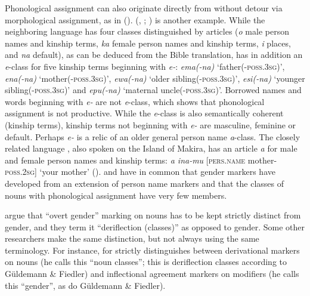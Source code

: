 \documentclass[output=collectionpaper]{langsci/langscibook}
\begin{document}
Phonological assignment can also originate directly from  without detour via morphological assignment, as in  (\citealt{Waelchli2018}).  (, ; \citealt[26]{Mellow2013}) is another example. While the neighboring language  has four classes distinguished by articles (\textit{o} male person names and kinship terms, \textit{ka} female person names and kinship terms, \textit{i} places, and \textit{na} default), as can be deduced from the  Bible translation,  has in addition an \textit{e}-class for five kinship terms beginning with \textit{e-}: \textit{ema(-na)} `father(\mbox{\textsc{-poss.3sg}})', \textit{ena(-na)} `mother(\textsc{-poss.3sg})', \textit{ewa(-na)
} `older sibling(\textsc{-poss.3sg})', \textit{esi(-na)} `younger sibling(\textsc{-poss.3sg})' and \textit{epu(-na)} `maternal uncle(\textsc{-poss.3sg})'. Borrowed names and words beginning with \textit{e-} are not \textit{e}-class, which shows that phonological assignment is not productive. While the \textit{e}-class is also semantically coherent (kinship terms), kinship terms not beginning with \textit{e-} are masculine, feminine or default. Perhaps \textit{e-} is a relic of an older general person name \textit{a}-class. The closely related language , also spoken on the Island of Makira, has an article \textit{a} for male and female person names and kinship terms: \textit{a ina-mu} [\textsc{pers.name} mother\textsc{-poss.2sg}] `your mother' (\citealt[14, 40]{Capell1971}).  and  have in common that gender markers have developed from an extension of person name markers and that the classes of nouns with phonological assignment have very few members.

 argue that ``overt gender'' marking on nouns has to be kept strictly distinct from gender, and they term it ``deriflection (classes)'' as opposed to gender. Some other researchers make the same distinction, but not always using the same terminology. For instance, \cite[181--221]{Evans2003} for  strictly distinguishes between derivational markers on nouns (he calls this ``noun classes''; this is deriflection classes according to Güldemann \& Fiedler) and inflectional agreement markers on modifiers (he calls this ``gender'', as do Güldemann \& Fiedler).
\end{document}
